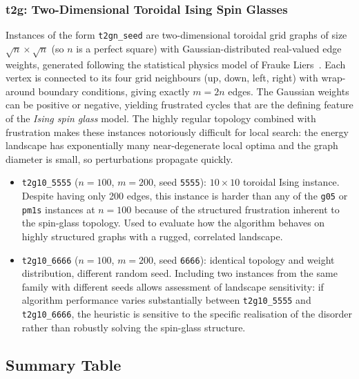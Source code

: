 \documentclass[12pt]{article}
\begin{document}
\subsubsection*{t2g: Two-Dimensional Toroidal Ising Spin Glasses}

Instances of the form \texttt{t2gn\_seed} are two-dimensional toroidal grid graphs
of size $\sqrt{n} \times \sqrt{n}$ (so $n$ is a perfect square) with
Gaussian-distributed real-valued edge weights, generated following the statistical
physics model of Frauke Liers~\cite{liers}.
Each vertex is connected to its four grid neighbours (up, down, left, right) with
wrap-around boundary conditions, giving exactly $m = 2n$ edges.
The Gaussian weights can be positive or negative, yielding frustrated cycles that
are the defining feature of the \emph{Ising spin glass} model.
The highly regular topology combined with frustration makes these instances
notoriously difficult for local search: the energy landscape has exponentially many
near-degenerate local optima and the graph diameter is small, so perturbations
propagate quickly.

\begin{itemize}
    \item \texttt{t2g10\_5555} ($n=100$, $m=200$, seed \texttt{5555}): $10\times10$
          toroidal Ising instance. Despite having only 200 edges, this instance
          is harder than any of the \texttt{g05} or \texttt{pm1s} instances at
          $n=100$ because of the structured frustration inherent to the spin-glass
          topology. Used to evaluate how the algorithm behaves on highly structured
          graphs with a rugged, correlated landscape.
    \item \texttt{t2g10\_6666} ($n=100$, $m=200$, seed \texttt{6666}): identical
          topology and weight distribution, different random seed. Including two
          instances from the same family with different seeds allows assessment of
          landscape sensitivity: if algorithm performance varies substantially
          between \texttt{t2g10\_5555} and \texttt{t2g10\_6666}, the heuristic is
          sensitive to the specific realisation of the disorder rather than robustly
          solving the spin-glass structure.
\end{itemize}

\subsection{Summary Table}
\end{document}
